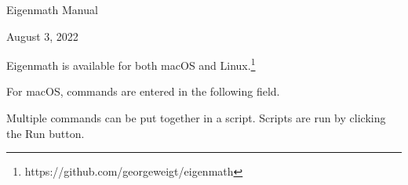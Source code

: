 \documentclass[12pt]{article}
\begin{document}
\begin{center}
{\LARGE Eigenmath Manual}

\bigskip
August 3, 2022
\end{center}

\tableofcontents

\newpage

\noindent
Eigenmath is available for both macOS and Linux.\footnote{https://github.com/georgeweigt/eigenmath}

\bigskip
\noindent
For macOS, commands are entered in the following field.

\begin{center}
\end{center}

\noindent
Multiple commands can be put together in a script.
Scripts are run by clicking the Run button.

\begin{center}
\end{center}
\end{document}

